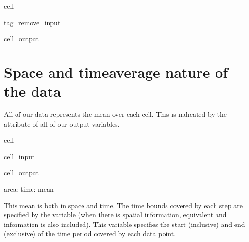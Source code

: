 \documentclass[letterpaper,10pt,english]{jupyterBook}
\begin{document}
\begin{sphinxuseclass}{cell}
\begin{sphinxuseclass}{tag_remove_input}\begin{sphinxVerbatimOutput}

\begin{sphinxuseclass}{cell_output}
\noindent{}

\end{sphinxuseclass}\end{sphinxVerbatimOutput}

\end{sphinxuseclass}
\end{sphinxuseclass}

\section{Space\sphinxhyphen{} and time\sphinxhyphen{}average nature of the data}
\label{\detokenize{user-guide-historical:space-and-time-average-nature-of-the-data}}
\sphinxAtStartPar
All of our data represents the mean over each cell.
This is indicated by the  attribute
of all of our output variables.

\begin{sphinxuseclass}{cell}\begin{sphinxVerbatimInput}

\begin{sphinxuseclass}{cell_input}
\begin{sphinxVerbatim}[commandchars=\\\{\}]
\PYG{p}{[}\PYG{p}{]}\PYG{p}{[}\PYG{p}{]}
\end{sphinxVerbatim}

\end{sphinxuseclass}\end{sphinxVerbatimInput}
\begin{sphinxVerbatimOutput}

\begin{sphinxuseclass}{cell_output}
\begin{sphinxVerbatim}[commandchars=\\\{\}]
\PYGZsq{}area: time: mean\PYGZsq{}
\end{sphinxVerbatim}

\end{sphinxuseclass}\end{sphinxVerbatimOutput}

\end{sphinxuseclass}
\sphinxAtStartPar
This mean is both in space and time.
The time bounds covered by each step
are specified by the  variable
(when there is spatial information,
equivalent  and 
information is also included).
This variable specifies the start (inclusive)
and end (exclusive) of the time period
covered by each data point.
\end{document}
